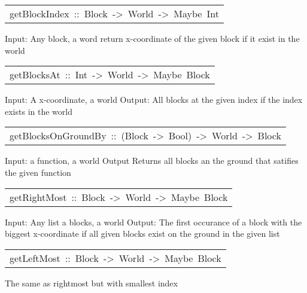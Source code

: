 \begin{haddockdesc}
\item[\begin{tabular}{@{}l}
getBlockIndex\ ::\ Block\ ->\ World\ ->\ Maybe\ Int
\end{tabular}]\haddockbegindoc
Input: Any block, a word
  return x-coordinate of the given block if it exist in the world
\par

\end{haddockdesc}
\begin{haddockdesc}
\item[\begin{tabular}{@{}l}
getBlocksAt\ ::\ Int\ ->\ World\ ->\ Maybe\ {\char 91}Block{\char 93}
\end{tabular}]\haddockbegindoc
Input:  A x-coordinate, a world 
  Output: All blocks at the given index if the index exists in the world
\par

\end{haddockdesc}
\begin{haddockdesc}
\item[\begin{tabular}{@{}l}
getBlocksOnGroundBy\ ::\ (Block\ ->\ Bool)\ ->\ World\ ->\ {\char 91}Block{\char 93}
\end{tabular}]\haddockbegindoc
Input: a function, a world
  Output Returns all blocks an the ground that satifies the given function 
\par

\end{haddockdesc}
\begin{haddockdesc}
\item[\begin{tabular}{@{}l}
getRightMost\ ::\ {\char 91}Block{\char 93}\ ->\ World\ ->\ Maybe\ Block
\end{tabular}]\haddockbegindoc
Input:  Any list a blocks, a world 
  Output: The first occurance of a block with the biggest x-coordinate 
        if all given blocks exist on the ground in the given list
\par

\end{haddockdesc}
\begin{haddockdesc}
\item[\begin{tabular}{@{}l}
getLeftMost\ ::\ {\char 91}Block{\char 93}\ ->\ World\ ->\ Maybe\ Block
\end{tabular}]\haddockbegindoc
The same as rightmost but with smallest index
\par

\end{haddockdesc}
